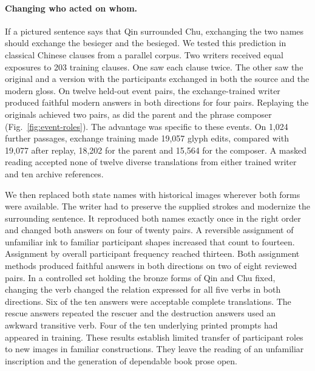 \documentclass[12pt,a4paper]{article}
\providecommand{\DIFadd}[1]{{\protect\color{blue} \sf #1}} %
\begin{document}
\paragraph{\DIFadd{Changing who acted on whom.}}
\DIFadd{If a pictured sentence says that Qin surrounded Chu, exchanging the two names should exchange the besieger and the besieged. We tested this prediction in classical Chinese clauses from a parallel corpus. Two writers received equal exposures to 203 training clauses. One saw each clause twice. The other saw the original and a version with the participants exchanged in both the source and the modern gloss. On twelve held-out event pairs, the exchange-trained writer produced faithful modern answers in both directions for four pairs. Replaying the originals achieved two pairs, as did the parent and the phrase composer (Fig.~\ref{fig:event-roles}). The advantage was specific to these events. On 1,024 further passages, exchange training made 19,057 glyph edits, compared with 19,077 after replay, 18,202 for the parent and 15,564 for the composer. A masked reading accepted none of twelve diverse translations from either trained writer and ten archive references.
}

\DIFadd{We then replaced both state names with historical images wherever both forms were available. The writer had to preserve the supplied strokes and modernize the surrounding sentence. It reproduced both names exactly once in the right order and changed both answers on four of twenty pairs. A reversible assignment of unfamiliar ink to familiar participant shapes increased that count to fourteen. Assignment by overall participant frequency reached thirteen. Both assignment methods produced faithful answers in both directions on two of eight reviewed pairs. In a controlled set holding the bronze forms of Qin and Chu fixed, changing the verb changed the relation expressed for all five verbs in both directions. Six of the ten answers were acceptable complete translations. The rescue answers repeated the rescuer and the destruction answers used an awkward transitive verb. Four of the ten underlying printed prompts had appeared in training. These results establish limited transfer of participant roles to new images in familiar constructions. They leave the reading of an unfamiliar inscription and the generation of dependable book prose open.
}
\end{document}
